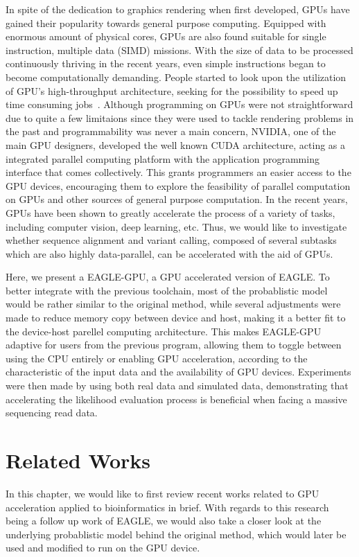 \documentclass{PHlab-thesis}
\begin{document}
In spite of the dedication to graphics rendering when first developed, GPUs have gained their popularity towards general purpose computing. Equipped with enormous amount of physical cores, GPUs are also found suitable for single instruction, multiple data (SIMD) missions. With the size of data to be processed continuously thriving in the recent years, even simple instructions began to become computationally demanding. People started to look upon the utilization of GPU's high-throughput architecture, seeking for the possibility to speed up time consuming jobs~\cite{owens2008gpu,nickolls2010gpu}. Although programming on GPUs were not straightforward due to quite a few limitaions since they were used to tackle rendering problems in the past and programmability was never a main concern, NVIDIA, one of the main GPU designers, developed the well known CUDA architecture, acting as a integrated parallel computing platform with the application programming interface that comes collectively. This grants programmers an easier access to the GPU devices, encouraging them to explore the feasibility of parallel computation on GPUs and other sources of general purpose computation. In the recent years, GPUs have been shown to greatly accelerate the process of a variety of tasks, including computer vision, deep learning, etc. Thus, we would like to investigate whether sequence alignment and variant calling, composed of several subtasks which are also highly data-parallel, can be accelerated with the aid of GPUs.

Here, we present a EAGLE-GPU, a GPU accelerated version of EAGLE. To better integrate with the previous toolchain, most of the probablistic model would be rather similar to the original method, while several adjustments were made to reduce memory copy between device and host, making it a better fit to the device-host parellel computing architecture. This makes EAGLE-GPU adaptive for users from the previous program, allowing them to toggle between using the CPU entirely or enabling GPU acceleration, according to the characteristic of the input data and the availability of GPU devices. Experiments were then made by using both real data and simulated data, demonstrating that accelerating the likelihood evaluation process is beneficial when facing a massive sequencing read data.

\chapter{Related Works}
In this chapter, we would like to first review recent works related to GPU acceleration applied to bioinformatics in brief. With regards to this research being a follow up work of EAGLE, we would also take a closer look at the underlying probablistic model behind the original method, which would later be used and modified to run on the GPU device.
\end{document}
